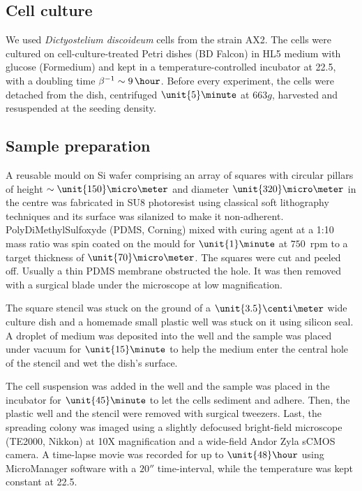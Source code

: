 \documentclass[11pt, twocolumn]{article}
\begin{document}
{\small
\subsection*{Cell culture}
We used \textit{Dictyostelium discoideum} cells from the strain
AX2. The cells were cultured on cell-culture-treated Petri dishes (BD
Falcon) in HL5 medium with glucose (Formedium) and kept in a
temperature-controlled incubator at 22.5\celsius, with a doubling
time $\beta^{-1}\sim9\,\hour$. Before every experiment,
the cells were detached from the dish, centrifuged $\unit{5}\minute$
at $663g$, harvested and resuspended at the seeding density.

\subsection*{Sample preparation}
A reusable mould on Si wafer comprising an array of squares with
circular pillars of height $\sim\unit{150}\micro\meter$ and diameter
$\unit{320}\micro\meter$ in the centre was fabricated in SU8
photoresist using classical soft lithography techniques and its
surface was silanized to make it non-adherent. PolyDiMethylSulfoxyde
(PDMS, Corning) mixed with curing agent at a 1:10 mass ratio was spin
coated on the mould for $\unit{1}\minute$ at $750$~rpm to a target
thickness of $\unit{70}\micro\meter$. The squares were cut and peeled
off. Usually a thin PDMS membrane obstructed the hole. It was then
removed with a surgical blade under the microscope at low
magnification.

The square stencil was stuck on the ground of a
$\unit{3.5}\centi\meter$ wide culture dish and a homemade small
plastic well was stuck on it using silicon seal. A droplet of medium
was deposited into the well and the sample was placed under vacuum for
$\unit{15}\minute$ to help the medium enter the central hole of the
stencil and wet the dish's surface.

The cell suspension was added in the well and the sample was placed in
the incubator for $\unit{45}\minute$ to let the cells sediment and
adhere. Then, the plastic well and the stencil were removed with
surgical tweezers. Last, the spreading colony was imaged using a
slightly defocused bright-field microscope (TE2000, Nikkon) at 10X
magnification and a wide-field Andor Zyla sCMOS camera. A time-lapse
movie was recorded for up to $\unit{48}\hour$ using MicroManager
software with a $\unit{20}\second$ time-interval, while the
temperature was kept constant at 22.5\celsius.

}
\end{document}
